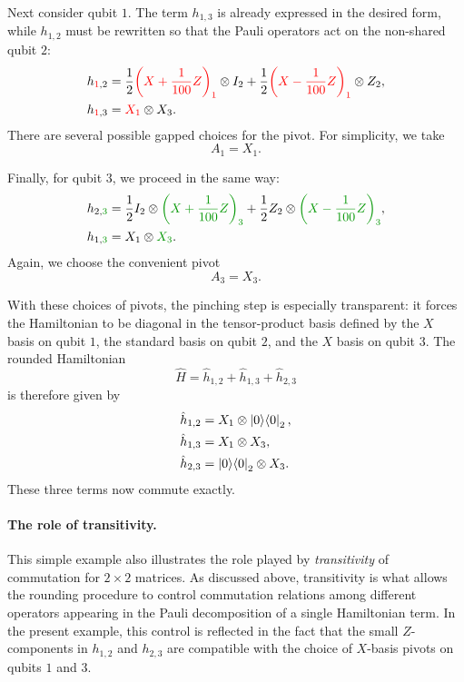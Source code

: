 \documentclass[a4paper,onecolumn,11pt]{quantumarticle}
\theoremstyle{plain}
\newcommand{\DarkGreen}[1]{\textcolor{DarkGreen}{#1}}
\newcommand{\red}[1]{{\color{red}#1}}
\newcommand{\proj}[1]{\ket{#1}\!\bra{#1}}
\begin{document}
Next consider qubit $1$.  The term $h_{1,3}$ is already expressed in the
desired form, while $h_{1,2}$ must be rewritten so that the Pauli operators
act on the non-shared qubit $2$:
\begin{align*}
    h_{\red{1},2}
        &= \frac{1}{2} \red{\left(X + \frac{1}{100} Z\right)_1}
            \otimes I_2
        + \frac{1}{2} \red{\left(X - \frac{1}{100} Z\right)_1}
            \otimes Z_2, \\
    h_{\red{1},3}
        &= \red{X_1} \otimes X_3 .
\end{align*}
There are several possible gapped choices for the pivot.  For simplicity,
we take
\[
    A_1 = X_1 .
\]

Finally, for qubit $3$, we proceed in the same way:
\begin{align*}
    h_{2,\DarkGreen{3}}
        &= \frac{1}{2} I_2 \otimes
            \DarkGreen{\left(X + \frac{1}{100} Z\right)_3}
        + \frac{1}{2} Z_2 \otimes
            \DarkGreen{\left(X - \frac{1}{100} Z\right)_3}, \\
    h_{1,\DarkGreen{3}}
        &= X_1 \otimes \DarkGreen{X_3}.
\end{align*}
Again, we choose the convenient pivot
\[
    A_3 = X_3 .
\]

With these choices of pivots, the pinching step is especially transparent:
it forces the Hamiltonian to be diagonal in the tensor-product basis
defined by the $X$ basis on qubit $1$, the standard basis on qubit $2$,
and the $X$ basis on qubit $3$.  The rounded Hamiltonian
\[
    \hat H = \hat h_{1,2} + \hat h_{1,3} + \hat h_{2,3}
\]
is therefore given by
\begin{align*}
    \hat h_{1,2} &= X_1 \otimes \proj{0}_2, \\
    \hat h_{1,3} &= X_1 \otimes X_3, \\
    \hat h_{2,3} &= \proj{0}_2 \otimes X_3.
\end{align*}
These three terms now commute exactly.

\paragraph{The role of transitivity.}

This simple example also illustrates the role played by \emph{transitivity} of
commutation for $2 \times 2$ matrices.  As discussed above, transitivity
is what allows the rounding procedure to control commutation relations
among different operators appearing in the Pauli decomposition of a
single Hamiltonian term.  In the present example, this control is reflected
in the fact that the small $Z$-components in $h_{1,2}$ and $h_{2,3}$ are
compatible with the choice of $X$-basis pivots on qubits $1$ and $3$.
\end{document}
